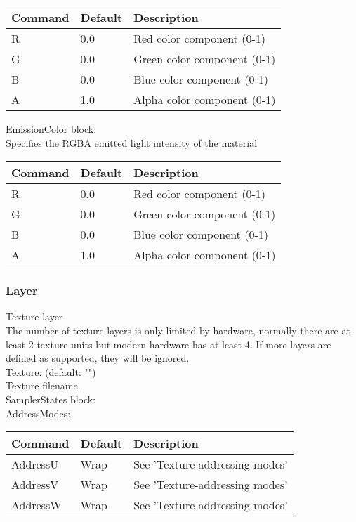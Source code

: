 \begin{tabular}{|p{2.5cm}|p{2.5cm}|p{9cm}|}
\hline
\textbf{Command} & \textbf{Default} & \textbf{Description}\\
\hline
R & 0.0 & Red color component (0-1)\\
G & 0.0 & Green color component (0-1)\\
B & 0.0 & Blue color component (0-1)\\
A & 1.0 & Alpha color component (0-1)\\
\hline
\end{tabular}


EmissionColor block:\\
Specifies the RGBA emitted light intensity of the material\\

\begin{tabular}{|p{2.5cm}|p{2.5cm}|p{9cm}|}
\hline
\textbf{Command} & \textbf{Default} & \textbf{Description}\\
\hline
R & 0.0 & Red color component (0-1)\\
G & 0.0 & Green color component (0-1)\\
B & 0.0 & Blue color component (0-1)\\
A & 1.0 & Alpha color component (0-1)\\
\hline
\end{tabular}




\subsubsection{Layer}
Texture layer\\
The number of texture layers is only limited by hardware, normally there are at least 2 texture
units but modern hardware has at least 4. If more layers are defined as supported, they will be ignored.\\


Texture: (default: "")\\
Texture filename.\\


SamplerStates block:\\
AddressModes:\\
\begin{tabular}{|p{2.5cm}|p{2.5cm}|p{9cm}|}
\hline
\textbf{Command} & \textbf{Default} & \textbf{Description}\\
\hline
AddressU & Wrap & See 'Texture-addressing modes'\\
\hline
AddressV & Wrap & See 'Texture-addressing modes'\\
\hline
AddressW & Wrap & See 'Texture-addressing modes'\\
\hline
\end{tabular}


